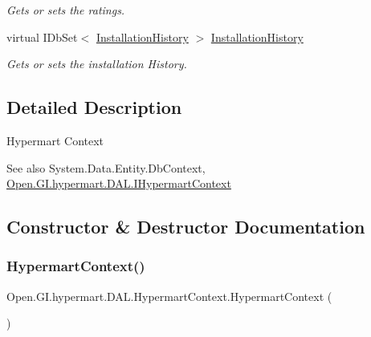 \begin{DoxyCompactItemize}
\begin{DoxyCompactList}\small\item\em Gets or sets the ratings. \end{DoxyCompactList}\item 
virtual I\+Db\+Set$<$ \hyperlink{class_open_1_1_g_i_1_1hypermart_1_1_models_1_1_installation_history}{Installation\+History} $>$ \hyperlink{class_open_1_1_g_i_1_1hypermart_1_1_d_a_l_1_1_hypermart_context_a0ea04cdf64676cc94cc0e910f9c2fe5f}{Installation\+History}
\begin{DoxyCompactList}\small\item\em Gets or sets the installation History. \end{DoxyCompactList}\end{DoxyCompactItemize}


\subsection{Detailed Description}
Hypermart Context 

\begin{DoxySeeAlso}{See also}
System.\+Data.\+Entity.\+Db\+Context, \hyperlink{interface_open_1_1_g_i_1_1hypermart_1_1_d_a_l_1_1_i_hypermart_context}{Open.\+G\+I.\+hypermart.\+D\+A\+L.\+I\+Hypermart\+Context}


\end{DoxySeeAlso}


\subsection{Constructor \& Destructor Documentation}
\hypertarget{class_open_1_1_g_i_1_1hypermart_1_1_d_a_l_1_1_hypermart_context_a3bcbe3fbf08e41a8b384326b606a7327}{}\label{class_open_1_1_g_i_1_1hypermart_1_1_d_a_l_1_1_hypermart_context_a3bcbe3fbf08e41a8b384326b606a7327} 
\subsubsection{\texorpdfstring{Hypermart\+Context()}{HypermartContext()}}
{\footnotesize\ttfamily Open.\+G\+I.\+hypermart.\+D\+A\+L.\+Hypermart\+Context.\+Hypermart\+Context (\begin{DoxyParamCaption}{ }\end{DoxyParamCaption})}



